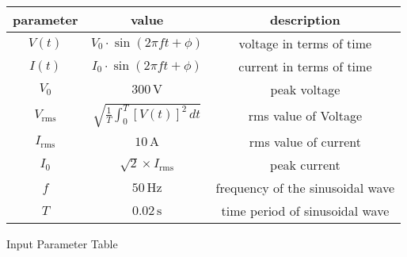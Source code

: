 
  \begin{tabular}{|c|c|c|}
    \hline
    parameter & value & description \\
    \hline
    $V(t)$ & $V_{\text{0}} \cdot \sin(2\pi ft + \phi)$ & voltage in terms of time \\
    \hline
    $I(t)$ & $I_{\text{0}} \cdot \sin(2\pi ft + \phi)$ & current in terms of time \\
    \hline
    $V_0$ & $300 \, \text{V}$ & peak voltage \\
    \hline
    $V_\text{rms}$ & $\sqrt{\frac{1}{T} \int_{0}^{T} [V(t)]^2 \, dt}$ & rms value of Voltage \\
    \hline 
    $I_\text{rms}$ & $10 \, \text{A}$ & rms value of current\\
    \hline
    $I_0$ & $\sqrt{2} \times I_{\text{rms}}$ & peak current \\
    \hline
    $f$ & $50 \, \text{Hz}$ & frequency of the sinusoidal wave \\
    \hline
    $T$ & $0.02 \, \text{s}$ & time period of sinusoidal wave \\
    \hline
  \end{tabular}

\caption{Input Parameter Table}
\label{tab:input_parameters}

